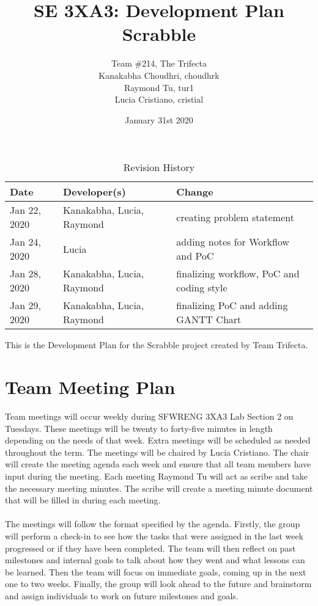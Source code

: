 \documentclass{article}
\title{SE 3XA3: Development Plan\\Scrabble}
\author{Team \#214, The Trifecta
		\\ Kanakabha Choudhri, choudhrk
		\\ Raymond Tu, tur1
		\\ Lucia Cristiano, cristial
}
\date{January 31st 2020}
\begin{document}
\begin{table}[hp]
\caption{Revision History} \label{TblRevisionHistory}
\begin{tabularx}{\textwidth}{llX}
\toprule
\textbf{Date} & \textbf{Developer(s)} & \textbf{Change}\\
\midrule
Jan 22, 2020 & Kanakabha, Lucia, Raymond & creating problem statement\\
Jan 24, 2020 & Lucia & adding notes for Workflow and PoC\\
Jan 28, 2020 & Kanakabha, Lucia, Raymond & finalizing workflow, PoC and coding style\\
Jan 29, 2020 & Kanakabha, Lucia, Raymond & finalizing PoC and adding GANTT Chart\\
\bottomrule
\end{tabularx}
\end{table}

\newpage

\maketitle

This is the Development Plan for the Scrabble project created by Team Trifecta.

\section{Team Meeting Plan}
Team meetings will occur weekly during SFWRENG 3XA3 Lab Section 2 on Tuesdays. These meetings will be twenty to forty-five minutes in length depending on the needs of that week. Extra meetings will be scheduled as needed throughout the term. The meetings will be chaired by Lucia Cristiano. The chair will create the meeting agenda each week and ensure that all team members have input during the meeting. Each meeting Raymond Tu will act as scribe and take the necessary meeting minutes. The scribe will create a meeting minute document that will be filled in during each meeting.\\ \\
The meetings will follow the format specified by the agenda. Firstly, the group will perform a check-in to see how the tasks that were assigned in the last week progressed or if they have been completed. The team will then reflect on past milestones and internal goals to talk about how they went and what lessons can be learned. Then the team will focus on immediate goals, coming up in the next one to two weeks. Finally, the group will look ahead to the future and brainstorm and assign individuals to work on future milestones and goals.
\end{document}
